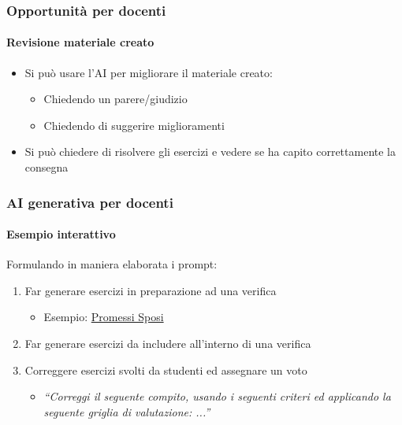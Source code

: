 \begin{contentframe}
    \frametitle{Opportunità per docenti}
    \framesubtitle{Revisione materiale creato}

    \begin{itemize}
        \item Si può usare l'AI per migliorare il materiale creato:
        \begin{itemize}
            \item Chiedendo un parere/giudizio
            \item Chiedendo di suggerire miglioramenti
        \end{itemize}

        \bigskip
        \item Si può chiedere di risolvere gli esercizi e vedere se ha capito correttamente la consegna
    \end{itemize}
\end{contentframe}

\begin{exerciseframe}
    \frametitle{AI generativa per docenti}
    \framesubtitle{Esempio interattivo}

    Formulando in maniera elaborata i prompt:
    \begin{enumerate}
        \item Far generare esercizi in preparazione ad una verifica
        \begin{itemize}
            \item Esempio: \href{https://chatgpt.com/share/678ba114-e39c-8003-9f3e-cba11d1fea00}{Promessi Sposi}
        \end{itemize}

        \bigskip
        \item Far generare esercizi da includere all'interno di una verifica
        
        \bigskip
        \item Correggere esercizi svolti da studenti ed assegnare un voto
        \begin{itemize}
            \item \textit{``Correggi il seguente compito, usando i seguenti criteri ed applicando la seguente griglia di valutazione: ...''}
        \end{itemize}
    \end{enumerate}
\end{exerciseframe}


